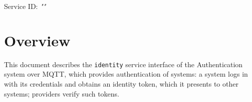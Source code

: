 \documentclass[a4paper]{arrowhead}
\begin{document}
\sloppy

\ArrowheadSetup

\begin{center}
  \vspace*{1cm}
  \huge{\arrowtitle}

  \vspace*{0.2cm}
  \LARGE{\arrowtype}
  \vspace*{1cm}

  \Large{Service ID: \textit{"\arrowid"}}

  \vspace*{\fill}


  \vspace*{1cm}
  \vspace*{\fill}

  \begin{abstract}
    This document describes the MQTT protocol with TLS payload security and JSON payload encoding variant of the \texttt{identity} service of the Authentication system.
  \end{abstract}

  \vspace*{1cm}
\end{center}

\newpage

\tableofcontents
\newpage

\section{Overview}
\label{sec:overview}

This document describes the \texttt{identity} service interface of the Authentication system over MQTT, which provides authentication of systems: a system logs in with its credentials and obtains an identity token, which it presents to other systems; providers verify such tokens.
\end{document}
